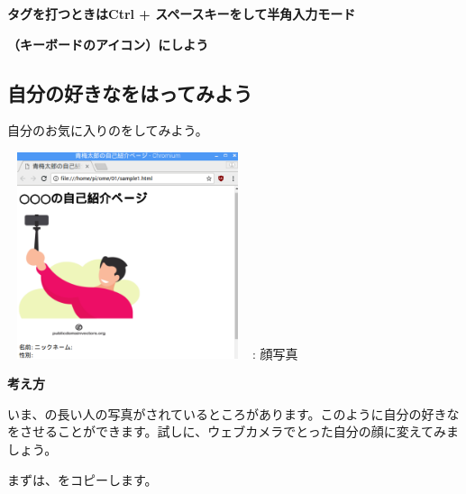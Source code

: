\documentclass[a4paper,12pt]{jarticle}
\begin{document}
{\centering\bfseries
  タグを打つときはCtrl +
  スペースキーをして半角入力モード
  \par}

{\centering\bfseries
  （キーボードのアイコン）にしよう
  \par}

\clearpage
\flushleft
{}
\subsection{\theExercise 自分の好きなをはってみよう}
\addtocounter{Exercise}{-1}\label{E:embImginHTML}\label{E:HTML_3}
自分のお気に入りのをしてみよう。

\centering
\begin{minipage}{6.738cm}
  {\upshape
    \includegraphics[width=7.071cm,height=6.048cm]{textbook-img161.png}
    \newline
    : 顔写真}
\end{minipage}

\flushleft
\textbf{考え方}


いま、の長い人の写真がされているところがあります。このように自分の好きなをさせることができます。試しに、ウェブカメラでとった自分の顔に変えてみましょう。

まずは、をコピーします。


\bigskip
\end{document}
